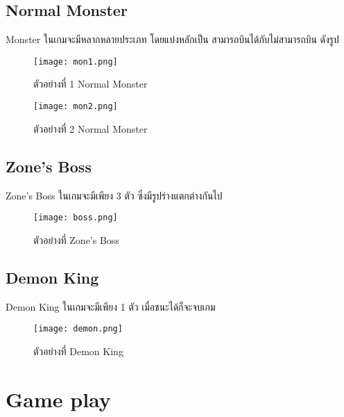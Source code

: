 \subsection{Normal Monster}
Monster ในเกมจะมีหลากหลายประเภท โดยแบ่งหลักเป็น สามารถบินได้กับไม่สามารถบิน ดังรูป
\begin{figure}[htbp]
  \centering 
  \texttt{[image: mon1.png]}
  \caption[Normal Monster1]{ตัวอย่างที่ 1 Normal Monster}
  \label{fig:NormalMon1}
\end{figure}

\begin{figure}[htbp]
  \centering 
  \texttt{[image: mon2.png]}
  \caption[Normal Monster2]{ตัวอย่างที่ 2 Normal Monster}
  \label{fig:NormalMon2}
\end{figure}


\subsection{Zone’s Boss}
Zone’s Boss ในเกมจะมีเพียง 3 ตัว ซึ่งมีรูปร่างแตกต่างกันไป
\begin{figure}[htbp]
  \centering 
  \texttt{[image: boss.png]}
  \caption[Zone’s Boss]{ตัวอย่างที่ Zone’s Boss}
  \label{fig:ZoneBoss }
\end{figure}
  

\subsection{Demon King}
Demon King ในเกมจะมีเพียง 1 ตัว เมื่อชนะได้ก็จะจบเกม
\begin{figure}[htbp]
  \centering 
  \texttt{[image: demon.png]}
  \caption[Demon King]{ตัวอย่างที่ Demon King}
  \label{fig:DemonKing }
\end{figure}

\section{Game play}
